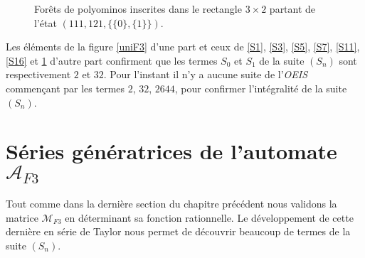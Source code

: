 \begin{figure}[!htb]
\begin{minipage}[c]{.20\linewidth}
  \centering
\begin{logicpuzzle}[rows=2,columns=3,color=cyan!100, width=750px,scale=0.5]
\framepuzzle[black!50]
\end{logicpuzzle}
\end{minipage}
\hfill
\begin{minipage}[c]{.28\linewidth}
  \centering
\begin{logicpuzzle}[rows=2,columns=3,color=cyan!100, width=750px,scale=0.5]
\framepuzzle[black!50]
\end{logicpuzzle}
\end{minipage}
\hfill
\begin{minipage}[c]{.16\linewidth}
  \centering
  \end{minipage}
\caption{\label{S20} Forêts de polyominos inscrites dans le rectangle $3\times 2$ partant de l'état $(111,121,\{\{0\},\{1\}\})$.}
\end{figure}  
\newpage

Les éléments de la figure \ref{uniF3} d'une part et ceux de \ref{S1}, \ref{S3}, \ref{S5}, \ref{S7}, \ref{S11}, \ref{S16} et \ref{S20} d'autre part confirment que les termes $S_{0}$ et $S_{1}$ de la suite $(S_{n})$ sont respectivement $2$ et $32$. Pour l'instant il n'y a aucune suite de l'\emph{OEIS} commençant par les termes $2$, $32$, $2644$, pour confirmer l'intégralité de la suite $(S_{n})$.

\section{Séries génératrices de l'automate $\mathcal{A}_{F3}$}
Tout comme dans la dernière  section du chapitre précédent  nous validons la matrice $\mathcal{M}_{F3}$ en déterminant sa fonction rationnelle. Le développement de cette dernière en série de Taylor nous permet de découvrir beaucoup de termes de la suite $(S_{n})$.

